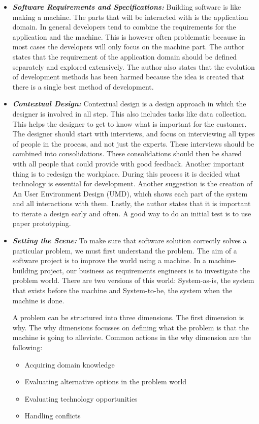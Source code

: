 \documentclass[]{article}
\begin{document}
\begin{itemize}
    \item[] \textbf{\textit{Software Requirements and Specifications: }}
    Building software is like making a machine. The parts that will be interacted 
    with is the application domain. In general developers tend to combine the 
    requirements for the application and the machine. This is however often 
    problematic because in most cases the developers will only focus on the machine part.
    The author states that the requirement of the application domain should be 
    defined separately and explored extensively. The author also states that 
    the evolution of development methods has been harmed because the idea is 
    created that there is a single best method of development. 

    \item[] \textbf{\textit{Contextual Design: }}
    Contextual design is a design approach in which the designer is involved in all step.
    This also includes tasks like data collection. This helps the designer to 
    get to know what is important for the customer. The designer should start with 
    interviews, and focus on interviewing all types of people in the process, and not just 
    the experts. These interviews should be combined into consolidations. These
    consolidations should then be shared with all people that could provide with 
    good feedback. Another important thing is to redesign the workplace. 
    During this process it is decided what technology is essential for development.
    Another suggestion is the creation of An User Environment Design (UMD), which 
    shows each part of the system and all interactions with them. Lastly, the 
    author states that it is important to iterate a design early and often. A
    good way to do an initial test is to use paper prototyping.

    \item[] \textbf{\textit{Setting the Scene: }}
    To make sure that software solution correctly solves a particular problem, 
    we must first understand the problem. 
    The aim of a software project is to improve the world using a machine. 
    In a machine-building project, our business as requirements engineers is to 
    investigate the problem world. There are two versions of this world: System-as-is, 
    the system that exists before the machine and System-to-be, 
    the system when the machine is done. 

    A problem can be structured into three dimensions. 
    The first dimension is why. The why dimensions focusses on defining what the problem is 
    that the machine is going to alleviate. Common actions in the why dimension 
    are the following:
    \begin{itemize}
        \item[] Acquiring domain knowledge 
        \item[] Evaluating alternative options in the problem world 
        \item[] Evaluating technology opportunities 
        \item[] Handling conflicts
    \end{itemize}


\end{itemize}
\end{document}
